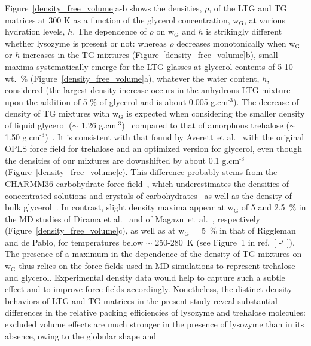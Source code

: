 \documentclass[journal=jpcbfk,manuscript=article]{achemso}
\newcommand*{\citen}[1]{%
\begingroup
\romannumeral-`\x %
\setcitestyle{numbers}%
\cite{#1}%
\endgroup   
}
\begin{document}
\begin{singlespacing}
Figure~\ref{density_free_volume}a-b shows the densities, $\rho$, of the LTG and TG matrices at 300 K as a function of the
glycerol concentration, w$_{\textrm{G}}$, at various hydration levels, $h$. The dependence of $\rho$ on w$_{\textrm{G}}$ 
and $h$ is strikingly different whether lysozyme is present or not: whereas $\rho$ decreases monotonically 
when w$_{\textrm{G}}$ or $h$ increases in the TG mixtures (Figure~\ref{density_free_volume}b), 
small maxima systematically emerge for the LTG glasses at glycerol 
contents of 5-10 wt.~\% (Figure~\ref{density_free_volume}a), 
whatever the water content, $h$, considered (the largest density increase occurs in the anhydrous LTG mixture upon the addition 
of 5 \% of glycerol and is about 0.005 g.cm$^{\textrm{-3}}$). 
The decrease of density of TG mixtures with w$_{\textrm{G}}$ is expected when considering the smaller density of 
liquid glycerol ($\sim$ 1.26 g.cm$^{\textrm{-3}}$)~\cite{Bosart1928}
compared to that of amorphous trehalose ($\sim$ 1.50 g.cm$^{\textrm{-3}}$)~\cite{Imamura2008}.
It is consistent with that found by Averett~et al.~\cite{Averett2012} with the original OPLS force field for
trehalose and an optimized version for glycerol, even though the densities of our mixtures 
are downshifted by about 0.1 g.cm$^{\textrm{-3}}$ (Figure~\ref{density_free_volume}c). This difference probably stems from the CHARMM36 carbohydrate 
force field~\cite{Guvench2008,Guvench2009,Hatcher2009}, 
which underestimates the densities of concentrated solutions and crystals of carbohydrates~\cite{Guvench2009}
as well as the density of bulk glycerol~\cite{Averett2012}. In contrast, slight density maxima appear at w$_{\textrm{G}}$ of 5 and 2.5~\% in the MD 
studies of Dirama et al.~\cite{Dirama2005} and of Magazu~et~al.~\cite{Magazu2010}, 
respectively (Figure~\ref{density_free_volume}c), as well as at w$_{\textrm{G}}$ = 5~\% in that of Riggleman and de Pablo, 
for temperatures below $\sim$ 250-280~K (see Figure~1 in ref.~[\citen{Riggleman2008}]). The presence of a maximum in the dependence 
of the density of TG mixtures on w$_{\textrm{G}}$ thus relies on the force fields used in MD simulations 
to represent trehalose and glycerol. Experimental density data would help to capture such a subtle effect and to improve force fields accordingly.
Nonetheless, the distinct density behaviors of LTG and TG matrices in the present study reveal substantial differences in 
the relative packing efficiencies of lysozyme and trehalose molecules: excluded volume effects are 
much stronger in the presence of lysozyme than in its absence, owing to the globular shape and 

\end{singlespacing}
\end{document}
